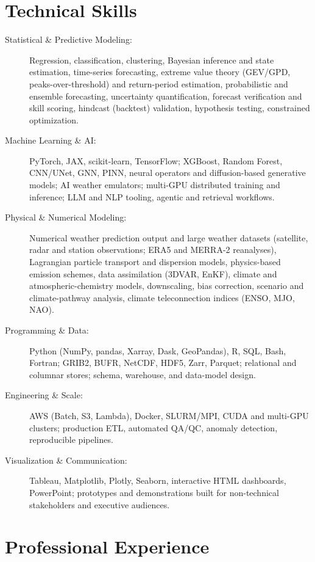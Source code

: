 \documentclass[10pt]{article}
\begin{document}
\section*{Technical Skills}
\begin{description}
  \item[Statistical \& Predictive Modeling:] Regression, classification,
    clustering, Bayesian inference and state estimation, time-series
    forecasting, extreme value theory (GEV/GPD, peaks-over-threshold) and
    return-period estimation, probabilistic and ensemble forecasting,
    uncertainty quantification, forecast verification and skill scoring,
    hindcast (backtest) validation, hypothesis testing, constrained
    optimization.
  \item[Machine Learning \& AI:] PyTorch, JAX, scikit-learn,
    TensorFlow; XGBoost, Random Forest, CNN/UNet, GNN, PINN, neural operators
    and diffusion-based generative models; AI weather emulators; multi-GPU
    distributed training and inference; LLM and NLP tooling, agentic and
    retrieval workflows.
  \item[Physical \& Numerical Modeling:] Numerical weather prediction
    output and large weather datasets (satellite, radar and station
    observations; ERA5 and MERRA-2 reanalyses), Lagrangian particle
    transport and dispersion models,
    physics-based emission schemes, data assimilation (3DVAR, EnKF), climate
    and atmospheric-chemistry models, downscaling, bias correction, scenario
    and climate-pathway analysis, climate teleconnection indices (ENSO, MJO,
    NAO).
  \item[Programming \& Data:] Python (NumPy, pandas, Xarray, Dask,
    GeoPandas), R, SQL, Bash, Fortran; GRIB2, BUFR, NetCDF, HDF5, Zarr,
    Parquet; relational and columnar stores; schema, warehouse, and
    data-model design.
  \item[Engineering \& Scale:] AWS (Batch, S3, Lambda), Docker,
    SLURM/MPI, CUDA and multi-GPU clusters; production ETL, automated QA/QC,
    anomaly detection, reproducible pipelines.
  \item[Visualization \& Communication:] Tableau, Matplotlib, Plotly,
    Seaborn, interactive HTML dashboards, PowerPoint; prototypes and
    demonstrations built for non-technical stakeholders and executive
    audiences.
\end{description}

\section*{Professional Experience}
\end{document}
